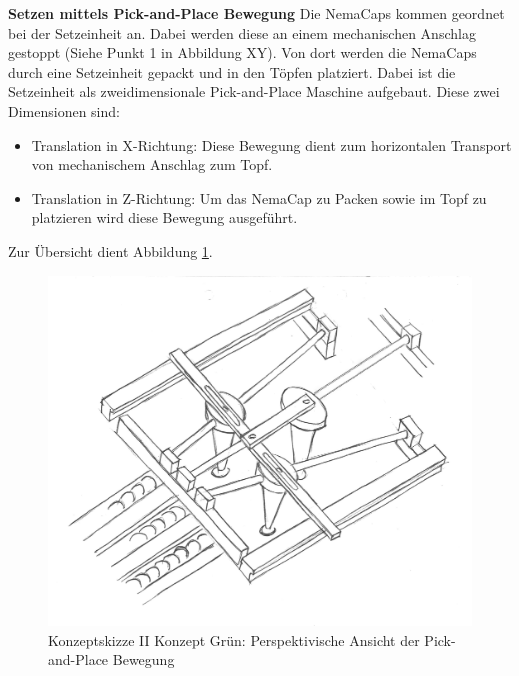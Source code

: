 \textbf{Setzen mittels Pick-and-Place Bewegung}
\newline
Die NemaCaps kommen geordnet bei der Setzeinheit an. Dabei werden diese an einem mechanischen Anschlag gestoppt (Siehe Punkt 1 in Abbildung XY). Von dort werden die NemaCaps durch eine Setzeinheit gepackt und in den Töpfen platziert. Dabei ist die Setzeinheit als zweidimensionale Pick-and-Place Maschine aufgebaut. Diese zwei Dimensionen sind:
\begin{itemize}
	\item Translation in X-Richtung: Diese Bewegung dient zum horizontalen Transport von mechanischem Anschlag zum Topf.
	\item Translation in Z-Richtung: Um das NemaCap zu Packen sowie im Topf zu platzieren wird diese Bewegung ausgeführt.
\end{itemize}
Zur Übersicht dient Abbildung \ref{fig:transport_green_pers}. 
\begin{figure}[H]
	\includegraphics[scale=0.6]{Illustrationen/5-Konzept/green_2Dmachine_pervsp.jpg}
	\caption{Konzeptskizze II Konzept Grün: Perspektivische Ansicht der Pick-and-Place Bewegung}
	\label{fig:transport_green_pers}
\end{figure}

